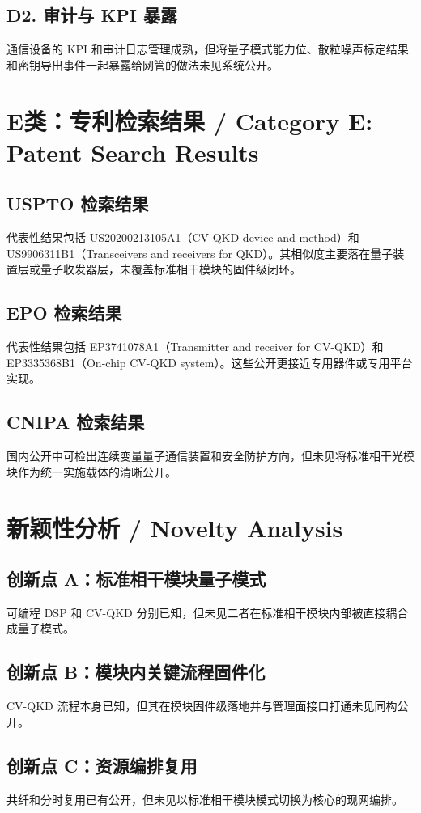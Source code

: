 ﻿\documentclass[12pt,a4paper]{article}
\begin{document}
\subsection{D2. 审计与 KPI 暴露}
通信设备的 KPI 和审计日志管理成熟，但将量子模式能力位、散粒噪声标定结果和密钥导出事件一起暴露给网管的做法未见系统公开。

\section{E类：专利检索结果 / Category E: Patent Search Results}
\subsection{USPTO 检索结果}
代表性结果包括 US20200213105A1（CV-QKD device and method）和 US9906311B1（Transceivers and receivers for QKD）。其相似度主要落在量子装置层或量子收发器层，未覆盖标准相干模块的固件级闭环。

\subsection{EPO 检索结果}
代表性结果包括 EP3741078A1（Transmitter and receiver for CV-QKD）和 EP3335368B1（On-chip CV-QKD system）。这些公开更接近专用器件或专用平台实现。

\subsection{CNIPA 检索结果}
国内公开中可检出连续变量量子通信装置和安全防护方向，但未见将标准相干光模块作为统一实施载体的清晰公开。

\section{新颖性分析 / Novelty Analysis}
\subsection{创新点 A：标准相干模块量子模式}
可编程 DSP 和 CV-QKD 分别已知，但未见二者在标准相干模块内部被直接耦合成量子模式。

\subsection{创新点 B：模块内关键流程固件化}
CV-QKD 流程本身已知，但其在模块固件级落地并与管理面接口打通未见同构公开。

\subsection{创新点 C：资源编排复用}
共纤和分时复用已有公开，但未见以标准相干模块模式切换为核心的现网编排。
\end{document}
